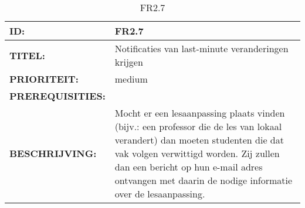 
\noindent\begin{table}[h]
            \begin{tabular}{l | p{10cm}}
                \textbf{ID:} & FR2.7 \\ \hline
                \textbf{TITEL:} & Notificaties van last-minute veranderingen krijgen\\ \hline
                \textbf{PRIORITEIT:} &  medium \\ \hline
                \textbf{PREREQUISITIES:} & \\ \hline
                \textbf{BESCHRIJVING:} & Mocht er een lesaanpassing plaats vinden (bijv.: een professor die de les van lokaal verandert) dan moeten studenten die dat vak volgen verwittigd worden. 
                                        Zij zullen dan een bericht op hun e-mail adres ontvangen met daarin de nodige informatie over de lesaanpassing.\\
            \end{tabular}\\
            \caption{FR2.7}
\label{tab:mythirteenthtable}
        \end{table}
\clearpage